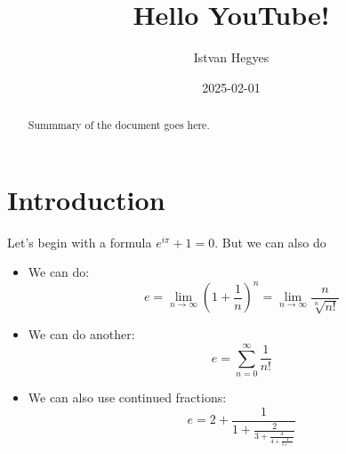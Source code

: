 \documentclass{article}
\title{Hello YouTube!}
\author{Istvan Hegyes}
\date{2025-02-01}
\begin{document}
\maketitle

\begin{abstract}
    Summmary of the document goes here.
\end{abstract}

\section{Introduction}
Let's begin with a formula $e^{i\pi}+1=0$. But we can also do

\begin{itemize}
    \item
          We can do:
          \[
              e=\lim_{n \to \infty} \left(1+\frac{1}{n}\right)^n=
              \lim_{n \to \infty} \frac{n}{\sqrt[n]{n!}}
          \]
    \item
          We can do another:
          \[
              e=\sum_{n=0}^{\infty} \frac{1}{n!}
          \]
    \item
          We can also use continued fractions:
          \[
              e=2+\frac{1}{1+\frac{2}{3+\frac{3}{4+\frac{4}{5+\ddots}}}}
          \]
\end{itemize}
\end{document}
